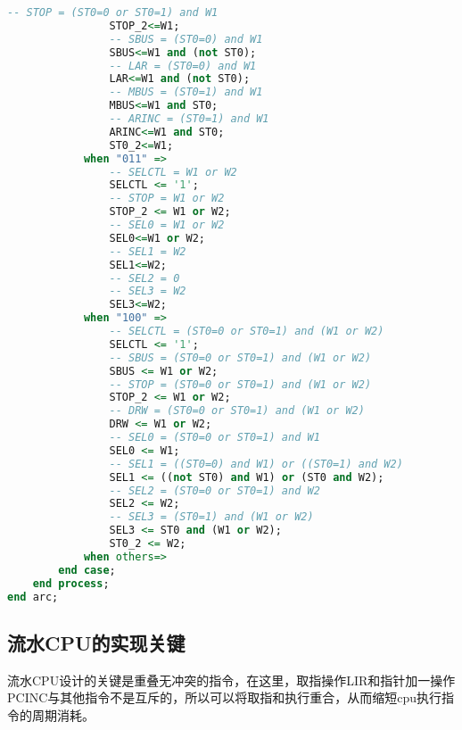 \documentclass[UTF8]{ctexart}
\begin{document}
{\begin{lstlisting}[language={VHDL}]
				-- STOP = (ST0=0 or ST0=1) and W1
				STOP_2<=W1;
				-- SBUS = (ST0=0) and W1
				SBUS<=W1 and (not ST0);
				-- LAR = (ST0=0) and W1
				LAR<=W1 and (not ST0);
				-- MBUS = (ST0=1) and W1
				MBUS<=W1 and ST0;
				-- ARINC = (ST0=1) and W1
				ARINC<=W1 and ST0;
				ST0_2<=W1;
			when "011" =>
				-- SELCTL = W1 or W2
				SELCTL <= '1';
				-- STOP = W1 or W2
				STOP_2 <= W1 or W2;
				-- SEL0 = W1 or W2
				SEL0<=W1 or W2;
				-- SEL1 = W2
				SEL1<=W2;
				-- SEL2 = 0
				-- SEL3 = W2
				SEL3<=W2;
			when "100" =>
				-- SELCTL = (ST0=0 or ST0=1) and (W1 or W2)
				SELCTL <= '1';
				-- SBUS = (ST0=0 or ST0=1) and (W1 or W2)
				SBUS <= W1 or W2;
				-- STOP = (ST0=0 or ST0=1) and (W1 or W2)
				STOP_2 <= W1 or W2;
				-- DRW = (ST0=0 or ST0=1) and (W1 or W2)
				DRW <= W1 or W2;
				-- SEL0 = (ST0=0 or ST0=1) and W1
				SEL0 <= W1;
				-- SEL1 = ((ST0=0) and W1) or ((ST0=1) and W2)
				SEL1 <= ((not ST0) and W1) or (ST0 and W2);
				-- SEL2 = (ST0=0 or ST0=1) and W2
				SEL2 <= W2;
				-- SEL3 = (ST0=1) and (W1 or W2) 
				SEL3 <= ST0 and (W1 or W2);
				ST0_2 <= W2;
			when others=>
		end case;
	end process;
end arc;
\end{lstlisting}
}
\subsection{流水CPU的实现关键}
\begin{figure}[!ht]
	\centering
\end{figure}
流水CPU设计的关键是重叠无冲突的指令，在这里，取指操作LIR和指针加一操作PCINC与其他指令不是互斥的，所以可以将取指和执行重合，从而缩短cpu执行指令的周期消耗。
\end{document}
